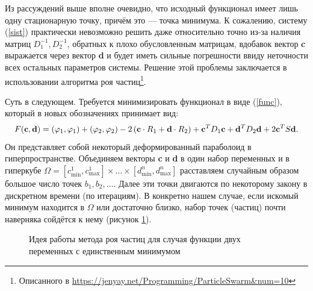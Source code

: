 \documentclass[a4paper, 12pt]{article}
\begin{document}
Из рассуждений выше вполне очевидно, что исходный функционал имеет лишь одну стационарную точку, причём это --- точка минимума.
К сожалению, систему (\ref{sist}) практически невозможно решить даже относительно точно из-за наличия матриц $D_1^{-1}, D_2^{-1}$, обратных к плохо обусловленным матрицам, вдобавок
вектор {\bf c} выражается через вектор {\bf d} и будет иметь сильные погрешности ввиду неточности всех остальных параметров системы.
Решение этой проблемы заключается в использовании алгоритма роя частиц\footnote{Описанного в \url{https://jenyay.net/Programming/ParticleSwarm&num=10}}.

Суть в следующем. Требуется минимизировать функционал в виде (\ref{func}), который в новых обозначениях принимает вид:
\begin{equation}
  F({\bf c},{\bf d})=(\varphi_1,\varphi_1)+(\varphi_2,\varphi_2)-2\left({\bf c}\cdot R_1+{\bf d}\cdot R_2\right)+
  {\bf c}^T D_1 {\bf c}+{\bf d}^T D_2 {\bf d}+2{\bf c}^T S {\bf d}.
\end{equation}
Он представляет собой некоторый деформированный параболоид в гиперпространстве.
Объединяем векторы {\bf c} и {\bf d} в один набор переменных и в гиперкубе $\Omega=[c^1_{\min},c^1_{\max}] \times \dots \times [d^n_{\min},d^n_{\max}]$
расставляем случайным образом большое число точек $b_1, b_2, \dots$.
Далее эти точки двигаются по некоторому закону в дискретном времени (по итерациям).
В конкретно нашем случае, если искомый минимум находится в $\Omega$ или достаточно близко, набор точек (частиц) почти наверняка сойдётся к нему (рисунок \ref{parab}).

\begin{figure}[h!]
  \caption{Идея работы метода роя частиц для случая функции двух переменных с единственным минимумом}
  \label{parab}
\end{figure}
\end{document}
